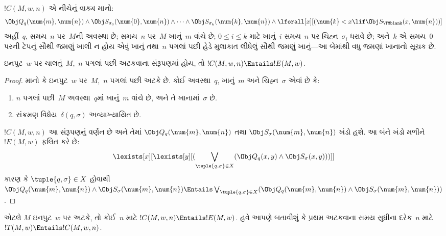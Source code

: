 \begin{defn}
$!C(M, w, n)$ એ નીચેનું વાક્ય માનો:
\[
\Obj Q_q(\num{m}, \num{n}) \land \Obj S_{\sigma_0}(\num{0}, \num{n})
\land \dots \land \Obj S_{\sigma_k}(\num{k}, \num{n}) \land
\lforall[x][(\num{k} < x \lif \Obj S_\TMblank(x, \num{n}))]
\]
અહીં~$q$, સમય~$n$ પર~$M$ની અવસ્થા છે;
સમય~$n$ પર~$M$ ખાનું~$m$ વાંચે છે;
$0 \le i \le k$ માટે ખાનું~$i$ સમય~$n$ પર
ચિહ્ન~$\sigma_i$ ધરાવે છે;
અને~$k$ એ સમય~$0$ પરની ટેપનું સૌથી જમણું ખાલી
ન હોય એવું ખાનું તથા~$n$ પગલાં પછી હેડે મુલાકાત
લીધેલું સૌથી જમણું ખાનું—આ બેમાંથી વધુ જમણાં
ખાનાનો સૂચક છે.
\end{defn}

\begin{lem}
ઇનપુટ~$w$ પર ચાલતું~$M$,~$n$ પગલાં પછી
અટકવાના સંરૂપણમાં હોય, તો
$!C(M, w, n) \Entails !E(M, w)$.
\end{lem}

\begin{proof}
માનો કે ઇનપુટ~$w$ પર~$M$,~$n$ પગલાં પછી અટકે છે.
કોઈ અવસ્થા~$q$, ખાનું~$m$ અને ચિહ્ન~$\sigma$
એવાં છે કે:
\begin{enumerate}
\item $n$ પગલાં પછી~$M$ અવસ્થા~$q$માં ખાનું~$m$
  વાંચે છે, અને તે ખાનામાં~$\sigma$ છે.
\item સંક્રમણ વિધેય~$\delta(q, \sigma)$ અવ્યાખ્યાયિત છે.
\end{enumerate}
$!C(M, w, n)$ આ સંરૂપણનું વર્ણન છે અને તેમાં
$\Obj Q_{q}(\num{m}, \num{n})$ તથા
$\Obj S_{\sigma}(\num{m}, \num{n})$ ખંડો હશે.
આ બંને ખંડો મળીને~$!E(M, w)$ ફલિત કરે છે:
\[
\lexists[x][\lexists[y][(\bigvee_{\tuple{q, \sigma} \in
      X}(\Obj Q_q(x, y) \land \Obj S_\sigma(x, y)))]]
\]
કારણ કે $\tuple{q,\sigma} \in X$ હોવાથી
$\Obj Q_q(\num{m}, \num{n}) \land
\Obj S_{\sigma}(\num{m}, \num{n}) \Entails
\bigvee_{\tuple{q, \sigma} \in X}
(\Obj Q_q(\num{m}, \num{n}) \land
\Obj S_{\sigma}(\num{m}, \num{n}))$.
\end{proof}

\begin{explain}
એટલે $M$ ઇનપુટ~$w$ પર અટકે, તો કોઈ~$n$ માટે
$!C(M, w, n) \Entails !E(M,w)$. હવે આપણે
બતાવીશું કે પ્રથમ અટકવાના સમય સુધીના દરેક~$n$ માટે
$!T(M, w) \Entails !C(M, w, n)$.
\end{explain}


